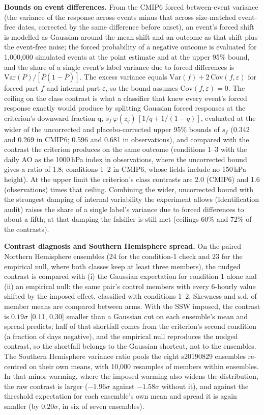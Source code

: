 \documentclass[11pt]{article}
\begin{document}
\textbf{Bounds on event differences.} From the CMIP6 forced between-event variance (the variance of the response across events minus that across size-matched event-free dates, corrected by the same difference before onset), an event's forced shift is modelled as Gaussian around the mean shift and an outcome as that shift plus the event-free noise; the forced probability of a negative outcome is evaluated for 1,000,000 simulated events at the point estimate and at the upper 95\% bound, and the share of a single event's label variance due to forced differences is $\mathrm{Var}(P)/[\bar P(1-\bar P)]$. The excess variance equals $\mathrm{Var}(f) + 2\,\mathrm{Cov}(f, \varepsilon)$ for forced part $f$ and internal part $\varepsilon$, so the bound assumes $\mathrm{Cov}(f, \varepsilon) = 0$. The ceiling on the class contrast is what a classifier that knew every event's forced response exactly would produce by splitting Gaussian forced responses at the criterion's downward fraction q, $s_f\,\varphi(z_q)\,[1/q + 1/(1-q)]$, evaluated at the wider of the uncorrected and placebo-corrected upper 95\% bounds of $s_f$ (0.342 and 0.269 in CMIP6; 0.596 and 0.681 in observations), and compared with the contrast the criterion produces on the same outcome (conditions 1–3 with the daily AO as the 1000\,hPa index in observations, where the uncorrected bound gives a ratio of 1.8; conditions 1–2 in CMIP6, whose fields include no 150\,hPa height). At the upper limit the criterion's class contrasts are 2.0 (CMIP6) and 1.6 (observations) times that ceiling. Combining the wider, uncorrected bound with the strongest damping of internal variability the experiment allows (Identification audit) raises the share of a single label's variance due to forced differences to about a fifth; at that damping the falsifier is still met (ceilings 60\% and 72\% of the contrasts).

\textbf{Contrast diagnosis and Southern Hemisphere spread.} On the paired Northern Hemisphere ensembles (24 for the condition-1 check and 23 for the empirical null, where both classes keep at least three members), the nudged contrast is compared with (i) the Gaussian expectation for condition 1 alone and (ii) an empirical null: the same pair's control members with every 6-hourly value shifted by the imposed effect, classified with conditions 1–2. Skewness and s.d. of member means are compared between arms. With the SSW imposed, the contrast is $0.19\sigma$ [0.11, 0.30] smaller than a Gaussian cut on each ensemble's mean and spread predicts; half of that shortfall comes from the criterion's second condition (a fraction of days negative), and the empirical null reproduces the nudged contrast, so the shortfall belongs to the Gaussian shortcut, not to the ensembles. The Southern Hemisphere variance ratio pools the eight s20190829 ensembles re-centred on their own means, with 10,000 resamples of members within ensembles. In that minor warming, where the imposed warming also widens the distribution, the raw contrast is larger ($-1.96\sigma$ against $-1.58\sigma$ without it), and against the threshold expectation for each ensemble's own mean and spread it is again smaller (by $0.20\sigma$, in six of seven ensembles).
\end{document}
